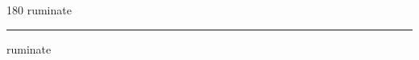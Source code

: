 
\begin{frame}
\begin{center}
\begin{turn}{180}
{\fontsize{2.5cm}{1em}\selectfont ruminate}
\end{turn}
\vspace{1em}\par  
\hrule
\vspace{1em}\par  
{\fontsize{2.5cm}{1em}\selectfont ruminate}
\end{center}
\end{frame}
